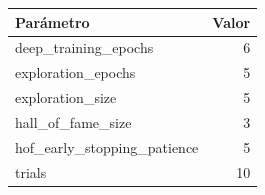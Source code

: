 \begin{tabular}{lr}
\toprule
Parámetro & Valor \\
\midrule
deep_training_epochs & 6 \\
exploration_epochs & 5 \\
exploration_size & 5 \\
hall_of_fame_size & 3 \\
hof_early_stopping_patience & 5 \\
trials & 10 \\
\bottomrule
\end{tabular}